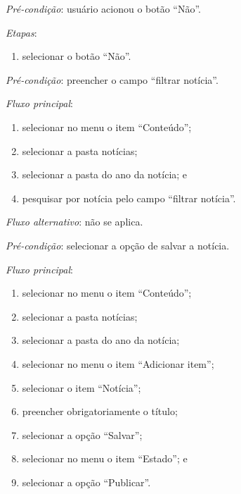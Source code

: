 \noindent \textit{Pré-condição}: usuário acionou o botão ``Não''.

\noindent \textit{Etapas}:

\begin{enumerate}
    \item selecionar o botão ``Não''.
\end{enumerate}



\vspace{0.7cm}

\noindent \textit{Pré-condição}: preencher o campo ``filtrar notícia''.

\noindent \textit{Fluxo principal}:

\begin{enumerate}
    \item selecionar no menu o item ``Conteúdo'';
    \item selecionar a pasta notícias;
    \item selecionar a pasta do ano da notícia; e
    \item pesquisar por notícia pelo campo ``filtrar notícia''.
\end{enumerate}

\noindent \textit{Fluxo alternativo}: não se aplica.


\vspace{0.7cm}

\noindent \textit{Pré-condição}: selecionar a opção de salvar a notícia.

\noindent \textit{Fluxo principal}:

\begin{enumerate}
    \item selecionar no menu o item ``Conteúdo'';
    \item selecionar a pasta notícias;
    \item selecionar a pasta do ano da notícia;
    \item selecionar no menu o item ``Adicionar item'';
    \item selecionar o item ``Notícia'';
    \item preencher obrigatoriamente o título;
    \item selecionar a opção ``Salvar'';
    \item selecionar no menu o item ``Estado''; e
    \item selecionar a opção ``Publicar''.
\end{enumerate}

